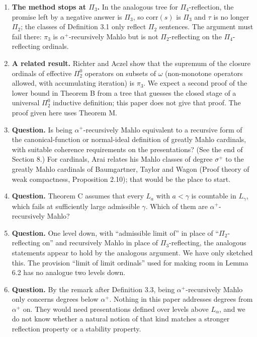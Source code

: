 \documentclass[11pt]{article}
\begin{document}
\begin{enumerate}
\item \textbf{The method stops at $\Pi_3$.} In the analogous tree for $\Pi_4$-reflection, the promise left by a
  negative answer is $\Pi_3$, so $\mathrm{corr}(s)$ is $\Pi_3$ and $\tau$ is no longer $\Pi_2$; the classes of
  Definition 3.1 only reflect $\Pi_2$ sentences. The argument must fail there: $\pi_3$ is $\alpha^+$-recursively Mahlo but is not
  $\Pi_2$-reflecting on the $\Pi_4$-reflecting ordinals.
\item \textbf{A related result.} Richter and Aczel show that the supremum of the closure ordinals of effective
  $\Pi^0_2$ operators on subsets of $\omega$ (non-monotone operators allowed, with accumulating iteration) is $\pi_3$.
  We expect a second proof of the lower bound in Theorem B from a tree that guesses the closed stage of a universal
  $\Pi^0_2$ inductive definition; this paper does not give that proof. The proof given here uses Theorem M.
\item \textbf{Question.} Is being $\alpha^+$-recursively Mahlo equivalent to a recursive form of the canonical-function or normal-ideal definition
  of greatly Mahlo cardinals, with suitable coherence requirements on the presentations? (See the end of Section 8.)
  For cardinals, Arai relates his Mahlo classes of degree $\sigma^+$ to the greatly Mahlo cardinals of Baumgartner,
  Taylor and Wagon (Proof theory of weak compactness, Proposition 2.10); that would be the place to start.
\item \textbf{Question.} Theorem C assumes that every $L_a$ with $a < \gamma$ is countable in $L_{\gamma}$, which fails at
  sufficiently large admissible $\gamma$. Which of them are $\alpha^+$-recursively Mahlo?
\item \textbf{Question.} One level down, with ``admissible limit of'' in place of ``$\Pi_2$-reflecting on'' and
  recursively Mahlo in place of $\Pi_3$-reflecting, the analogous statements appear to hold by the analogous argument.
  We have only sketched this. The provision ``limit of limit ordinals'' used for making room in Lemma 6.2 has no
  analogue two levels down.
\item \textbf{Question.} By the remark after Definition 3.3, being $\alpha^+$-recursively Mahlo only concerns degrees below $\alpha^+$. Nothing in
  this paper addresses degrees from $\alpha^+$ on. They would need presentations defined over levels above
  $L_{\alpha}$, and we do not know whether a natural notion of that kind matches a stronger reflection property or a
  stability property.
\end{enumerate}
\end{document}
